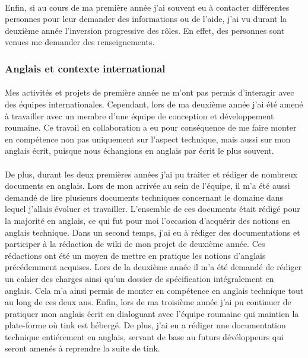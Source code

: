 \documentclass[12pt,a4paper]{report}
\begin{document}
\paragraph*{}Enfin, si au cours de ma première année j'ai souvent eu à contacter différentes personnes pour leur demander des informations ou de l'aide, j'ai vu durant la deuxième année l'inversion progressive des rôles. En effet, des personnes sont venues me demander des renseignements. \\
\subsubsection{Anglais et contexte international}
\paragraph*{}Mes activités et projets de première année ne m'ont pas permis d'interagir avec des équipes internationales. Cependant, lors de ma deuxième année j'ai été amené à travailler avec un membre d'une équipe de conception et développement roumaine. Ce travail en collaboration a eu pour conséquence de me faire monter en compétence non pas uniquement sur l'aspect technique, mais aussi sur mon anglais écrit, puisque nous échangions en anglais par écrit le plus souvent.
\paragraph*{}De plus, durant les deux premières années j'ai pu traiter et rédiger de nombreux documents en anglais. Lors de mon arrivée au sein de l'équipe, il m'a été aussi demandé de lire plusieurs documents techniques concernant le domaine dans lequel j'allais évoluer et travailler. L'ensemble de ces documents était rédigé pour la majorité en anglais, ce qui fut pour moi l'occasion d'acquérir des notions en anglais technique. Dans un second temps, j'ai eu à rédiger des documentations et participer à la rédaction de wiki de mon projet de deuxième année. Ces rédactions ont été un moyen de mettre en pratique les notions d’anglais précédemment acquises. Lors de la deuxième année il m'a été demandé de rédiger un cahier des charges ainsi qu'un dossier de spécification intégralement en anglais. Cela m'a ainsi permis de monter en compétence en anglais technique tout au long de ces deux ans. Enfin, lors de ma troisième année j'ai pu continuer de pratiquer mon anglais écrit en dialoguant avec l'équipe roumaine qui maintien la plate-forme où \gls{tink} est hébergé. De plus, j'ai eu a rédiger une documentation technique entiérement en anglais, servant de base au futurs dévéloppeurs qui seront amenés à reprendre la suite de \gls{tink}.\\
\end{document}
